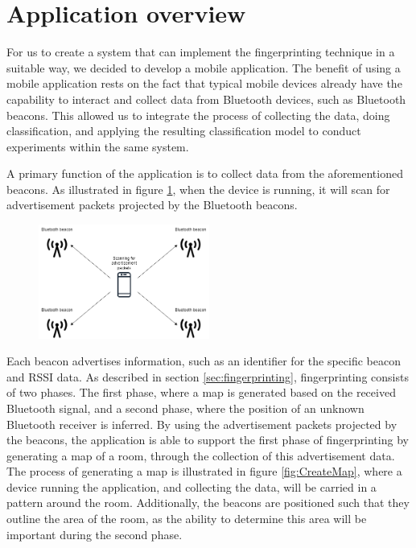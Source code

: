 \section{Application overview}
For us to create a system that can implement the fingerprinting technique in a suitable way, we decided to develop a mobile application. 
The benefit of using a mobile application rests on the fact that typical mobile devices already have the capability to interact and collect data from Bluetooth devices, such as Bluetooth beacons. 
This allowed us to integrate the process of collecting the data, doing classification, and applying the resulting classification model to conduct experiments within the same system.

A primary function of the application is to collect data from the aforementioned beacons. 
As illustrated in figure \ref{fig:ScanAdvertisement}, when the device is running, it will scan for advertisement packets projected by the Bluetooth beacons.

\begin{figure}[H]
    \centering
    \includegraphics[width=0.5\textwidth]{images/ScanningForAdvertisement.drawio.png}
    \caption{}
    \label{fig:ScanAdvertisement}
\end{figure}

Each beacon advertises information, such as an identifier for the specific beacon and RSSI data. 
As described in section \ref{sec:fingerprinting}, fingerprinting consists of two phases. 
The first phase, where a map is generated based on the received Bluetooth signal, and a second phase, where the position of an unknown Bluetooth receiver is inferred. 
By using the advertisement packets projected by the beacons, the application is able to support the first phase of fingerprinting by generating a map of a room, through the collection of this advertisement data. 
The process of generating a map is illustrated in figure \ref{fig:CreateMap}, where a device running the application, and collecting the data, will be carried in a pattern around the room. 
Additionally, the beacons are positioned such that they outline the area of the room, as the ability to determine this area will be important during the second phase.

